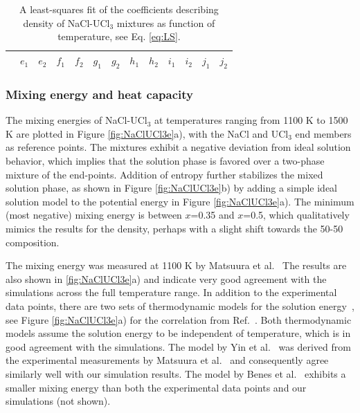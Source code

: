 \documentclass[preprint,3p,10pt,twocolumn,number,sort&compress]{elsarticle}
\begin{document}
\begin{table}[hb!]
\centering
\begin{tabular}{lcccccccccccc}
\hline
\hline
&$e_1$ &$e_2$ &$f_1$ &$f_2$ &$g_1$ &$g_2$ &$h_1$ &$h_2$ &$i_1$ &$i_2$ &$j_1$ &$j_2$ \\
\hline
\hline
\end{tabular}
\caption{A least-squares fit of the coefficients describing density of NaCl-UCl$_3$ mixtures as function of temperature, see Eq. \ref{eq:LS}.}%
\label{table:LS}
\end{table}

\subsubsection{Mixing energy and heat capacity}
The mixing energies of NaCl-UCl$_3$ at temperatures ranging from 1100 K to 1500 K are plotted in Figure \ref{fig:NaClUCl3e}a), with the NaCl and UCl$_3$ end members as reference points. The mixtures exhibit a negative deviation from ideal solution behavior, which implies that the solution phase is favored over a two-phase mixture of the end-points. Addition of entropy further stabilizes the mixed solution phase, as shown in Figure \ref{fig:NaClUCl3e}b) by adding a simple ideal solution model to the potential energy in Figure \ref{fig:NaClUCl3e}a).
 The minimum (most negative) mixing energy is between $x$=0.35 and  $x$=0.5, which qualitatively mimics the results for the density, perhaps with a slight shift towards the 50-50 composition. %
 
 The mixing energy was measured at 1100 K by Matsuura et al.~\cite{Matsuura} The results are also shown in \ref{fig:NaClUCl3e}a) and indicate very good agreement with the simulations across the full temperature range. In addition to the experimental data points, there are two sets of thermodynamic models for the solution energy~\cite{BENES2008,YIN2020}, see Figure \ref{fig:NaClUCl3e}a) for the correlation from Ref.~\cite{YIN2020}. Both thermodynamic models assume the solution energy to be independent of temperature, which is in good agreement with the simulations. The model by Yin et al.~\cite{YIN2020} was derived from the experimental measurements by Matsuura et al.~\cite{Matsuura} and consequently agree similarly well with our simulation results. The model by Benes et al.~\cite{BENES2008} exhibits a smaller mixing energy than both the experimental data points and our simulations (not shown). 
\end{document}
